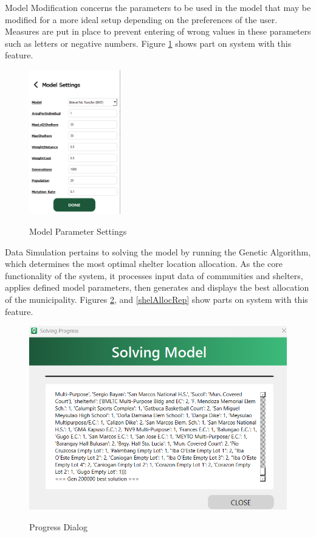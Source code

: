 \documentclass[12pt,a4paper,]{article}
\begin{document}
	Model Modification concerns the parameters to be used in the model that may be modified for a more ideal setup depending on the preferences of the user. Measures are put in place to prevent entering of wrong values in these parameters such as letters or negative numbers.  Figure \ref{modelSet} shows part on system with this feature.
	
	\begin{figure}[h!]
		\caption{Model Parameter Settings}
		\centering
		\includegraphics[width=150px]{Chapter 4/modelsettings}
		\label{modelSet}
	\end{figure}
	
	Data Simulation pertains to solving the model by running the Genetic Algorithm, which determines the most optimal shelter location allocation. As the core functionality of the system, it processes input data of communities and shelters, applies defined model parameters, then generates and displays the best allocation of the municipality. Figures \ref{solveProg}, and \ref{shelAllocRep} show parts on system with this feature.
	
	\begin{figure}[h!]
		\caption{Progress Dialog}
		\centering
		\includegraphics[width=\columnwidth]{Chapter 4/progress}
		\label{solveProg}
	\end{figure}
	
\end{document}
